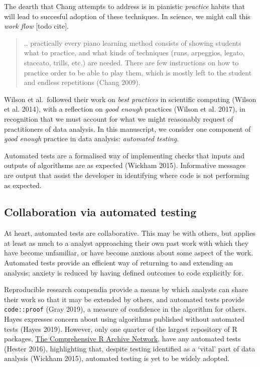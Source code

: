 \documentclass[
]{article}
\begin{document}
The dearth that Chang attempts to address is in pianistic
\emph{practice} habits that will lead to succesful adoption of these
techniques. In science, we might call this \emph{work flow} {[}todo
cite{]}.

\begin{quote}
.. practically every piano learning method consists of showing students
what to practice, and what kinds of techniques (runs, arpeggios, legato,
staccato, trills, etc.) are needed. There are few instructions on how to
practice order to be able to play them, which is mostly left to the
student and endless repetitions (Chang 2009).
\end{quote}

Wilson et al.~followed their work on \emph{best practices} in scientific
computing (Wilson et al. 2014), with a reflection on \emph{good enough}
practices (Wilson et al. 2017), in recognition that we must account for
what we might reasonably request of practitioners of data analysis. In
this manuscript, we consider one component of \emph{good enough}
practice in data analysis: \emph{automated testing}.

Automated tests are a formalised way of implementing checks that inputs
and outputs of algorithsms are as expected (Wickham 2015). Informative
messages are output that assist the developer in identifying where code
is not performing as expected.

\hypertarget{collaboration-via-automated-testing}{%
\subsection{Collaboration via automated
testing}\label{collaboration-via-automated-testing}}

At heart, automated tests are collaborative. This may be with others,
but applies at least as much to a analyst approaching their own past
work with which they have become unfamiliar, or have become anxious
about some aspect of the work. Automated tests provide an efficient way
of returning to and extending an analysis; anxiety is reduced by having
defined outcomes to code explicitly for.

Reproducible research compendia provide a means by which analysts can
share their work so that it may be extended by others, and automated
tests provide \texttt{code::proof} (Gray 2019), a measure of confidence
in the algorithm for others. Hayes expresses concern about using
algorithms published without automated tests (Hayes 2019). However, only
one quarter of the largest repository of R packages,
\href{https://cran.r-project.org/}{The Comprehensive R Archive Network},
have any automated tests (Hester 2016), highlighting that, despite
testing identified as a `vital' part of data analysis (Wickham 2015),
automated testing is yet to be widely adopted.
\end{document}
